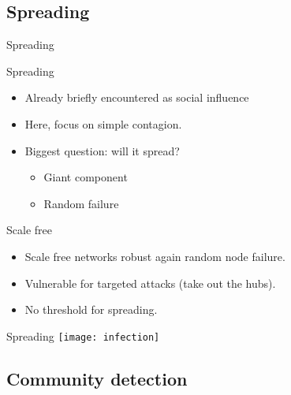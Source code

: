 \documentclass[hide notes,compress]{beamer}
\begin{document}
\subsection{Spreading}

\begin{frame}[c]{Spreading}

  \begin{block}{Spreading}
    \begin{itemize}
      \item Already briefly encountered as social influence
      \item Here, focus on simple contagion.
      \item Biggest question: will it spread?
        \begin{itemize}
          \item Giant component
          \item Random failure
        \end{itemize}
    \end{itemize}  
  \end{block}

  \vskip1cm

  \begin{block}{Scale free}
    \begin{itemize}
      \item Scale free networks robust again random node failure.
      \item Vulnerable for targeted attacks (take out the hubs).
      \item No threshold for spreading.
    \end{itemize}  
  \end{block}
  
\end{frame}

\begin{frame}[c]{Spreading}
    \texttt{[image: infection]}
\end{frame}

\subsection{Community detection}
\end{document}
